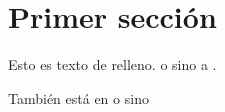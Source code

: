 \documentclass[12pt]{article}
\begin{document}
\tableofcontents

\section{Primer sección}
Esto es texto de relleno. \textcite{ercolani2007empleo} o sino a \parencite{lara2018estructuras,lozano2008criterios}.

También está en \cite[10]{rio2008patologia} o sino \cite[Ver también][xiv]{lozano2008criterios}

\printbibliography[heading=bibintoc]
\end{document}
